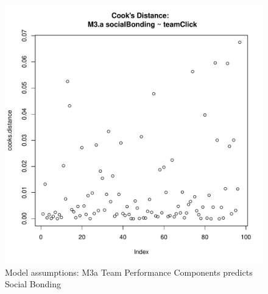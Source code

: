 {\begin{figure}[htbp]
        \includegraphics[scale =.4]{images/MLM3aCooksD.pdf}
        \caption{Model assumptions: M3a Team Performance Components predicts Social Bonding}
        \label{fig:MLM3aAssumptions}
      \end{figure}


}
